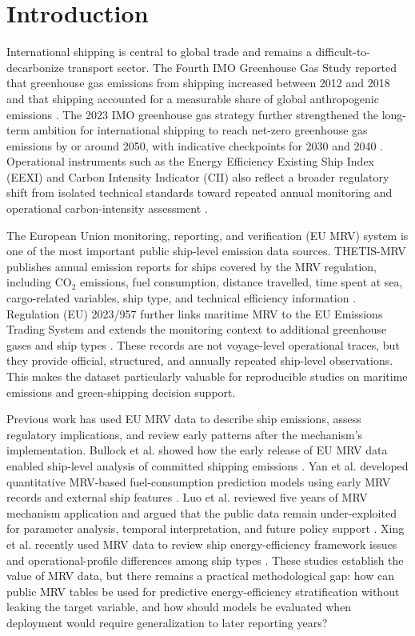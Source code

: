 \documentclass[jmse,article,submit,pdftex,oneauthor]{Definitions/mdpi}
\begin{document}
\section{Introduction}

International shipping is central to global trade and remains a difficult-to-decarbonize transport sector. The Fourth IMO Greenhouse Gas Study reported that greenhouse gas emissions from shipping increased between 2012 and 2018 and that shipping accounted for a measurable share of global anthropogenic emissions \cite{imo_fourth_ghg_study_2020}. The 2023 IMO greenhouse gas strategy further strengthened the long-term ambition for international shipping to reach net-zero greenhouse gas emissions by or around 2050, with indicative checkpoints for 2030 and 2040 \cite{imo_2023_ghg_strategy}. Operational instruments such as the Energy Efficiency Existing Ship Index (EEXI) and Carbon Intensity Indicator (CII) also reflect a broader regulatory shift from isolated technical standards toward repeated annual monitoring and operational carbon-intensity assessment \cite{imo_eexi_cii_faq}.

The European Union monitoring, reporting, and verification (EU MRV) system is one of the most important public ship-level emission data sources. THETIS-MRV publishes annual emission reports for ships covered by the MRV regulation, including CO$_2$ emissions, fuel consumption, distance travelled, time spent at sea, cargo-related variables, ship type, and technical efficiency information \cite{emsa_thetis_mrv,ec_2024_mrv_report,regulation_eu_2015_757}. Regulation (EU) 2023/957 further links maritime MRV to the EU Emissions Trading System and extends the monitoring context to additional greenhouse gases and ship types \cite{regulation_eu_2023_957}. These records are not voyage-level operational traces, but they provide official, structured, and annually repeated ship-level observations. This makes the dataset particularly valuable for reproducible studies on maritime emissions and green-shipping decision support.

Previous work has used EU MRV data to describe ship emissions, assess regulatory implications, and review early patterns after the mechanism's implementation. Bullock et al. showed how the early release of EU MRV data enabled ship-level analysis of committed shipping emissions \cite{bullock2020shipping_paris}. Yan et al. developed quantitative MRV-based fuel-consumption prediction models using early MRV records and external ship features \cite{yan2023mrv_energy_efficiency}. Luo et al. reviewed five years of MRV mechanism application and argued that the public data remain under-exploited for parameter analysis, temporal interpretation, and future policy support \cite{luo2024mrv_review}. Xing et al. recently used MRV data to review ship energy-efficiency framework issues and operational-profile differences among ship types \cite{xing2025mrv_efficiency_framework}. These studies establish the value of MRV data, but there remains a practical methodological gap: how can public MRV tables be used for predictive energy-efficiency stratification without leaking the target variable, and how should models be evaluated when deployment would require generalization to later reporting years?
\end{document}
